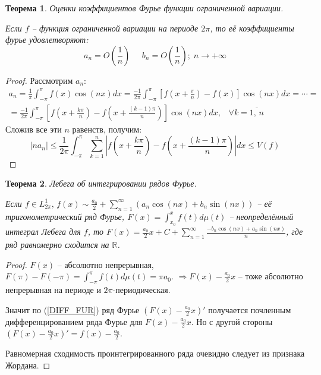 \documentclass[a4paper,12pt]{article}
\renewcommand{\leq}{\ensuremath{\leqslant}}
\theoremstyle{plain}
\newtheorem{theorem}{Теорема}[section]
\theoremstyle{definition}
\theoremstyle{remark}
\begin{document}
\begin{theorem}
	Оценки коэффициентов Фурье функции ограниченной вариации.

	Если $f$ -- функция ограниченной вариации на периоде $2\pi$, то её коэффициенты фурье удовлетворяют:
	\[a_n = O\left(\frac{1}{n}\right)\;\;\;\;\; b_n = O\left(\frac{1}{n}\right);\; n \to +\infty\]
\end{theorem}

\begin{proof}
	Рассмотрим $a_n$:
	\begin{align*}
		a_n = \frac{1}{\pi}\int_{-\pi}^\pi f(x)\cos(nx)dx = \frac{-1}{2\pi}\int_{-\pi}^\pi \left[f(x + \frac{\pi}{n}) - f(x)\right]\cos(nx)dx = \cdots = \\
		= \frac{-1}{2\pi}\int_{-\pi}^\pi \left[f\left(x + \frac{k\pi}{n}\right) - f\left(x + \frac{(k - 1)\pi}{n}\right)\right]\cos(nx)dx,\;\;\; \forall k = \overline{1,\,n}
	\end{align*}
	Сложив все эти $n$ равенств, получим:
	\[
		|na_n| \leq \frac{1}{2\pi} \int_{-\pi}^\pi \sum_{k = 1}^n \left|f\left(x + \frac{k\pi}{n}\right) - f\left(x + \frac{(k - 1)\pi}{n}\right)\right|dx \leq V(f)
	\]
\end{proof}

\begin{theorem}
	Лебега об интегрировании рядов Фурье.

	Если $f \in L^1_{2\pi},\, f(x) \sim \frac{a_0}{2} + \sum_{n = 1}^\infty (a_n\cos(nx) + b_n\sin(nx))$ -- её тригонометрический ряд Фурье, $F(x) = \int_{x_0}^x f(t)d\mu(t)$ -- неопределённый интеграл Лебега для $f$, то $F(x) = \frac{a_0}{2}x + C + \sum_{n = 1}^\infty \frac{-b_n\cos(nx) + a_n\sin(nx)}{n}$, где ряд равномерно сходится на $\mathbb{R}$.
\end{theorem}

\begin{proof}
	$F(x)$ -- абсолютно непрерывная, $F(\pi) - F(-\pi) = \int_{-\pi}^\pi f(t)d\mu(t) = \pi a_0$. $\Rightarrow F(x) - \frac{a_0}{2}x$ -- тоже абсолютно непрерывная на периоде и $2\pi$-периодическая.

	Значит по (\ref{DIFF_FUR}) ряд Фурье $\left(F(x) - \frac{a_0}{2}x\right)'$ получается почленным дифференцированием ряда Фурье для $F(x) - \frac{a_0}{2}x$. Но с другой стороны $\left(F(x) - \frac{a_0}{2}x\right)' = f(x) - \frac{a_0}{2}$.

	Равномерная сходимость проинтегрированного ряда очевидно следует из признака Жордана.
\end{proof}
\end{document}
